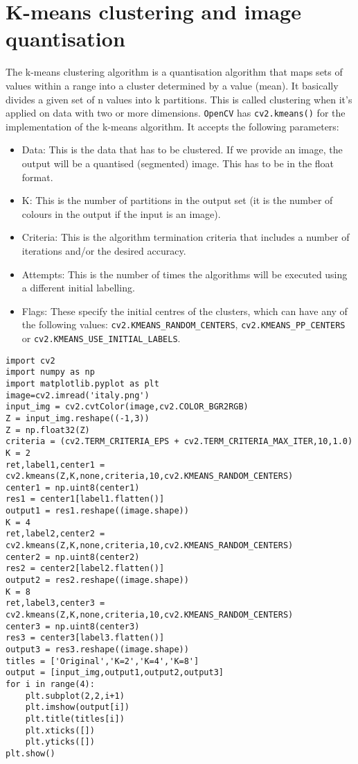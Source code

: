 \documentclass{labo}
\newcommand{\opencv}{\texttt{OpenCV} }
\begin{document}
\section*{K-means clustering and image quantisation}
The k-means clustering algorithm is a quantisation algorithm that maps sets of values within a range into a cluster determined by a value (mean). It basically divides a given set of n values into k partitions. This is called clustering when it's applied on data with two or more dimensions. \opencv has \texttt{cv2.kmeans()} for the implementation of the k-means algorithm. It accepts the following parameters:
\begin{itemize}
	\item Data: This is the data that has to be clustered. If we provide an image, the output will be a quantised (segmented) image. This has to be in the float format. 
	\item K: This is the number of partitions in the output set (it is the number of colours in the output if the input is an image). 
	\item Criteria: This is the algorithm termination criteria that includes a number of iterations and/or the desired accuracy. 
	\item Attempts: This is the number of times the algorithms will be executed using a different initial labelling. 
	\item Flags: These specify the initial centres of the clusters, which can have any of the following values: \texttt{cv2.KMEANS\_RANDOM\_CENTERS}, \texttt{cv2.KMEANS\_PP\_CENTERS} or \texttt{cv2.KMEANS\_USE\_INITIAL\_LABELS}.
\end{itemize}

\begin{verbatim}
import cv2 
import numpy as np 
import matplotlib.pyplot as plt 
image=cv2.imread('italy.png') 
input_img = cv2.cvtColor(image,cv2.COLOR_BGR2RGB) 
Z = input_img.reshape((-1,3)) 
Z = np.float32(Z) 
criteria = (cv2.TERM_CRITERIA_EPS + cv2.TERM_CRITERIA_MAX_ITER,10,1.0) 
K = 2 
ret,label1,center1 = cv2.kmeans(Z,K,none,criteria,10,cv2.KMEANS_RANDOM_CENTERS) 
center1 = np.uint8(center1) 
res1 = center1[label1.flatten()] 
output1 = res1.reshape((image.shape)) 
K = 4 
ret,label2,center2 = cv2.kmeans(Z,K,none,criteria,10,cv2.KMEANS_RANDOM_CENTERS) 
center2 = np.uint8(center2) 
res2 = center2[label2.flatten()] 
output2 = res2.reshape((image.shape)) 
K = 8 
ret,label3,center3 = cv2.kmeans(Z,K,none,criteria,10,cv2.KMEANS_RANDOM_CENTERS) 
center3 = np.uint8(center3) 
res3 = center3[label3.flatten()] 
output3 = res3.reshape((image.shape)) 
titles = ['Original','K=2','K=4','K=8'] 
output = [input_img,output1,output2,output3] 
for i in range(4): 
	plt.subplot(2,2,i+1)
	plt.imshow(output[i])
	plt.title(titles[i]) 
	plt.xticks([])
	plt.yticks([]) 
plt.show()
\end{verbatim}
\end{document}
